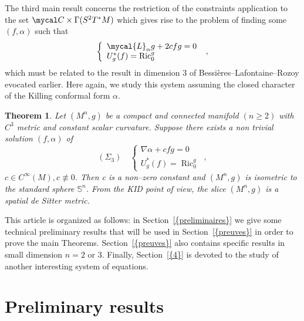 \documentclass[a4paper,11pt,leqno]{amsart}
\numberwithin{equation}{section}
\theoremstyle{main}
\newtheorem{thm} {\bf  Theorem} [section]
\begin{document}
The third main result concerns the restriction of the constraints application to the set $\mycal C \times \Gamma(S^2 T^*M)$ which gives rise to the problem of finding some $(f,\alpha)$ such that
$$\left\{
\begin{array}{l}
	 \mycal{L}_\alpha g + 2cfg= 0 \\
	 U_g^* (f)={\operatorname{Ric}}^g_0
\end{array}\right. \ ,$$
which must be related to the result in dimension 3 of Bessières--Lafontaine--Rozoy evocated earlier. Here again, we study this system assuming the closed character of the Killing conformal form $\alpha$.
\begin{thm}\label{BLR}
Let $(M^n, g)$ be a compact and connected manifold $(n\ge 2)$ with $C^3$ metric and constant scalar curvature. Suppose there exists a non trivial solution $(f,\alpha)$ of
$$(\Sigma_3)\quad \left\{
\begin{array}{l}
	 \nabla\alpha+ cfg= 0 \\
	 U_g^* (f)={\operatorname{Ric}}^g_0
\end{array}\right. \ ,$$
$c\in C^{\infty}(M), c\not\equiv 0$. Then c is a non--zero constant and $(M^n,g)$ is isometric to the standard sphere ${{\mathbb S^{n}}}$. From the KID point of view, the slice $(M^n, g)$ is a spatial de Sitter metric.
\end{thm}

This article is organized as follows: in Section~{\ref{{preliminaires}}} we give some technical preliminary results that will be used in Section~{\ref{{preuves}}} in order to prove the main Theorems. Section~{\ref{{preuves}}} also contains specific results in small dimension $n=2$ or $3$. Finally, Section~{\ref{{4}}} is devoted to the study of another interesting system of equations.

\section{Preliminary results}\label{preliminaires}
 
\end{document}
